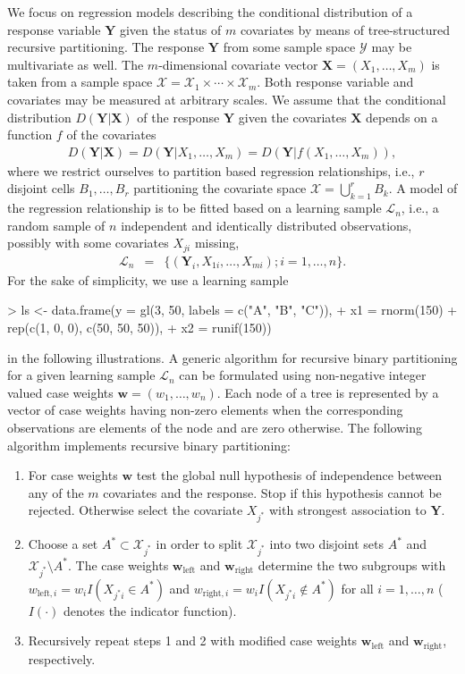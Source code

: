\documentclass{Z}
\newcommand{\LS}{\mathcal{L}_n}
\newcommand{\X}{\mathbf{X}}
\newcommand{\Y}{\mathbf{Y}}
\newcommand{\sX}{\mathcal{X}}
\newcommand{\sY}{\mathcal{Y}}
\newcommand{\w}{\mathbf{w}}
\begin{document}
We focus on regression models describing the conditional distribution of a
response variable $\Y$ given the status of $m$ covariates by
means of tree-structured recursive partitioning. The response $\Y$ from some
sample space $\sY$ may be multivariate as well. 
The $m$-dimensional covariate vector $\X = (X_1, \dots, X_m)$ is taken 
from a sample space $\sX = \sX_1 \times \cdots \times \sX_m$.
Both response variable and covariates may be measured
at arbitrary scales.
We assume that the conditional distribution $D(\Y | \X)$ of the response 
$\Y$ given the covariates $\X$ depends on a function $f$ of the covariates
\begin{eqnarray*} 
D(\Y | \X) = D(\Y | X_1, \dots, X_m) = D(\Y | f( X_1, \dots,
X_m)),
\end{eqnarray*}
where we restrict ourselves to partition based regression relationships,
i.e., $r$ disjoint cells $B_1, \dots, B_r$ partitioning the covariate space $\sX
= \bigcup_{k = 1}^r B_k$.
A model of the regression relationship is to be fitted based on a learning 
sample $\LS$, i.e., a random sample of $n$ independent and
identically distributed observations, possibly with some covariates $X_{ji}$
missing,
\begin{eqnarray*}
\LS & = & \{ (\Y_i, X_{1i}, \dots, X_{mi}); i = 1, \dots, n \}.
\end{eqnarray*}
For the sake of simplicity, we use a learning sample
\begin{Schunk}
\begin{Sinput}
> ls <- data.frame(y = gl(3, 50, labels = c("A", "B", "C")), 
+     x1 = rnorm(150) + rep(c(1, 0, 0), c(50, 50, 50)), 
+     x2 = runif(150))
\end{Sinput}
\end{Schunk}
in the following illustrations.
A generic algorithm for recursive binary partitioning for a given learning
sample $\LS$ can be formulated using non-negative integer valued case weights $\w
= (w_1, \dots, w_n)$. Each node of a tree is represented by a vector of
case weights having non-zero elements when the corresponding observations
are elements of the node and are zero otherwise. The following algorithm
implements recursive binary partitioning:
\begin{enumerate}
\item For case weights $\w$ test the global null hypothesis of independence between
      any of the $m$ covariates and the response. Stop if this 
      hypothesis cannot be rejected. 
      Otherwise select the covariate $X_{j^*}$ with strongest 
      association to $\Y$.
\item Choose a set $A^* \subset \sX_{j^*}$ in order to split $\sX_{j^*}$ into
      two disjoint sets $A^*$ and $\sX_{j^*} \setminus A^*$. 
      The case weights $\w_\text{left}$ and $\w_\text{right}$ determine the
      two subgroups with $w_{\text{left},i} = w_i I(X_{j^*i} \in A^*)$ and 
      $w_{\text{right},i} = w_i I(X_{j^*i} \not\in A^*)$ for all $i = 1,
      \dots, n$ ($I(\cdot)$ denotes the indicator function).
\item Recursively repeat steps 1 and 2 with modified case weights 
      $\w_\text{left}$ and $\w_\text{right}$, respectively.
\end{enumerate}
\end{document}
